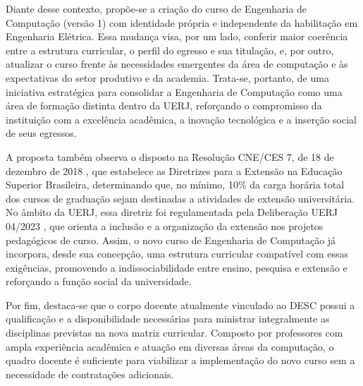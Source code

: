 Diante desse contexto, propõe-se a criação do curso de Engenharia de Computação (versão 1) com identidade própria e independente da habilitação em Engenharia Elétrica. Essa mudança visa, por um lado, conferir maior coerência entre a estrutura curricular, o perfil do egresso e sua titulação, e, por outro, atualizar o curso frente às necessidades emergentes da área de computação e às expectativas do setor produtivo e da academia. Trata-se, portanto, de uma iniciativa estratégica para consolidar a Engenharia de Computação como uma área de formação distinta dentro da UERJ, reforçando o compromisso da instituição com a excelência acadêmica, a inovação tecnológica e a inserção social de seus egressos.

A proposta também observa o disposto na Resolução CNE/CES  7, de 18 de dezembro de 2018 \cite{cne2018}, que estabelece as Diretrizes para a Extensão na Educação Superior Brasileira, determinando que, no mínimo, 10\% da carga horária total dos cursos de graduação sejam destinadas a atividades de extensão universitária. No âmbito da UERJ, essa diretriz foi regulamentada pela Deliberação UERJ  04/2023 \cite{uerj2023}, que orienta a inclusão e a organização da extensão nos projetos pedagógicos de curso. Assim, o novo curso de Engenharia de Computação já incorpora, desde sua concepção, uma estrutura curricular compatível com essas exigências, promovendo a indissociabilidade entre ensino, pesquisa e extensão e reforçando a função social da universidade.

Por fim, destaca-se que o corpo docente atualmente vinculado ao DESC possui a qualificação e a disponibilidade necessárias para ministrar integralmente as disciplinas previstas na nova matriz curricular. Composto por professores com ampla experiência acadêmica e atuação em diversas áreas da computação, o quadro docente é suficiente para viabilizar a implementação do novo curso sem a necessidade de contratações adicionais.
